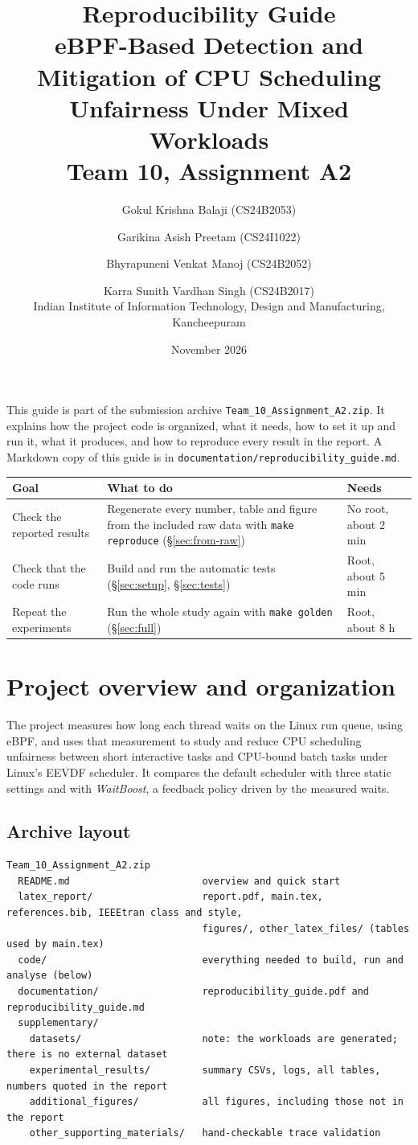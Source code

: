 \documentclass[10.5pt,a4paper]{article}
\title{\textbf{Reproducibility Guide}\\[4pt]
\large eBPF-Based Detection and Mitigation of CPU Scheduling Unfairness Under Mixed Workloads\\[2pt]
\normalsize Team 10, Assignment A2}
\author{Gokul Krishna Balaji (CS24B2053) \and Garikina Asish Preetam (CS24I1022) \and
Bhyrapuneni Venkat Manoj (CS24B2052) \and Karra Sunith Vardhan Singh (CS24B2017)\\[4pt]
\normalsize Indian Institute of Information Technology, Design and Manufacturing, Kancheepuram}
\date{November 2026}
\newcommand{\f}[1]{\texttt{#1}}
\begin{document}
\maketitle

This guide is part of the submission archive \f{Team\_10\_Assignment\_A2.zip}. It explains how the project code is organized, what it needs, how to set it up and run it, what it produces, and how to reproduce every result in the report. A Markdown copy of this guide is in \f{documentation/reproducibility\_guide.md}.

\begin{center}
\begin{tabularx}{\textwidth}{@{}lLl@{}}
\toprule
\textbf{Goal} & \textbf{What to do} & \textbf{Needs} \\
\midrule
Check the reported results & Regenerate every number, table and figure from the included raw data with \f{make reproduce} (\S\ref{sec:from-raw}) & No root, about 2 min \\
Check that the code runs & Build and run the automatic tests (\S\ref{sec:setup}, \S\ref{sec:tests}) & Root, about 5 min \\
Repeat the experiments & Run the whole study again with \f{make golden} (\S\ref{sec:full}) & Root, about 8 h \\
\bottomrule
\end{tabularx}
\end{center}

\section{Project overview and organization}

The project measures how long each thread waits on the Linux run queue, using eBPF, and uses that measurement to study and reduce CPU scheduling unfairness between short interactive tasks and CPU-bound batch tasks under Linux's EEVDF scheduler. It compares the default scheduler with three static settings and with \emph{WaitBoost}, a feedback policy driven by the measured waits.

\subsection{Archive layout}
\begin{lstlisting}
Team_10_Assignment_A2.zip
  README.md                       overview and quick start
  latex_report/                   report.pdf, main.tex, references.bib, IEEEtran class and style,
                                  figures/, other_latex_files/ (tables used by main.tex)
  code/                           everything needed to build, run and analyse (below)
  documentation/                  reproducibility_guide.pdf and reproducibility_guide.md
  supplementary/
    datasets/                     note: the workloads are generated; there is no external dataset
    experimental_results/         summary CSVs, logs, all tables, numbers quoted in the report
    additional_figures/           all figures, including those not in the report
    other_supporting_materials/   hand-checkable trace validation
\end{lstlisting}
\end{document}
